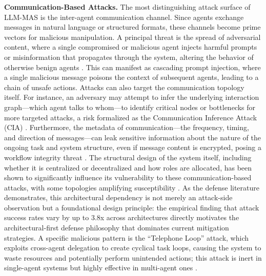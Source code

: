 \documentclass[11pt]{article}
\begin{document}
\textbf{Communication-Based Attacks.} The most distinguishing attack surface of LLM-MAS is the inter-agent communication channel. Since agents exchange messages in natural language or structured formats, these channels become prime vectors for malicious manipulation. A principal threat is the spread of adversarial content, where a single compromised or malicious agent injects harmful prompts or misinformation that propagates through the system, altering the behavior of otherwise benign agents \cite{ref408,ref409}. This can manifest as cascading prompt injection, where a single malicious message poisons the context of subsequent agents, leading to a chain of unsafe actions. Attacks can also target the communication topology itself. For instance, an adversary may attempt to infer the underlying interaction graph---which agent talks to whom---to identify critical nodes or bottlenecks for more targeted attacks, a risk formalized as the Communication Inference Attack (CIA) \cite{ref410}. Furthermore, the metadata of communication---the frequency, timing, and direction of messages---can leak sensitive information about the nature of the ongoing task and system structure, even if message content is encrypted, posing a workflow integrity threat \cite{ref411}. The structural design of the system itself, including whether it is centralized or decentralized and how roles are allocated, has been shown to significantly influence its vulnerability to these communication-based attacks, with some topologies amplifying susceptibility \cite{ref412,ref409}. As the defense literature demonstrates, this architectural dependency is not merely an attack-side observation but a foundational design principle: the empirical finding that attack success rates vary by up to 3.8x across architectures directly motivates the architectural-first defense philosophy that dominates current mitigation strategies. A specific malicious pattern is the ``Telephone Loop'' attack, which exploits cross-agent delegation to create cyclical task loops, causing the system to waste resources and potentially perform unintended actions; this attack is inert in single-agent systems but highly effective in multi-agent ones \cite{ref408}.
\end{document}
